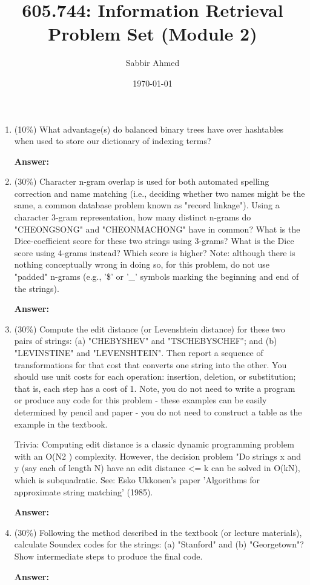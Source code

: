 \documentclass[11pt]{article}
\title{605.744: Information Retrieval \\ Problem Set (Module 2)}
\author{Sabbir Ahmed}
\date{\today}
\begin{document}
\maketitle	

    \begin{enumerate}

        \item (10\%) What advantage(s) do balanced binary trees have over hashtables when used to store our dictionary of indexing terms?

        \textbf{Answer:}

        \item (30\%) Character n-gram overlap is used for both automated spelling correction and name matching (i.e., deciding whether two names might be the same, a common database problem known as "record linkage"). Using a character 3-gram representation, how many distinct n-grams do "CHEONGSONG" and "CHEONMACHONG" have in common? What is the Dice-coefficient score for these two strings using 3-grams? What is the Dice score using 4-grams instead? Which score is higher? Note: although there is nothing conceptually wrong in doing so, for this problem, do not use "padded" n-grams (e.g., '\$' or '\_' symbols marking the beginning and end of the strings).

        \textbf{Answer:}

        \item (30\%) Compute the edit distance (or Levenshtein distance) for these two pairs of strings: (a) "CHEBYSHEV" and "TSCHEBYSCHEF"; and (b) "LEVINSTINE" and "LEVENSHTEIN". Then report a sequence of transformations for that cost that converts one string into the other. You should use unit costs for each operation: insertion, deletion, or substitution; that is, each step has a cost of 1. Note, you do not need to write a program or produce any code for this problem - these examples can be easily determined by pencil and paper - you do not need to construct a table as the example in the textbook.

        Trivia: Computing edit distance is a classic dynamic programming problem with an O(N2 ) complexity. However, the decision problem "Do strings x and y (say each of length N) have an edit distance <= k can be solved in O(kN), which is subquadratic. See: Esko Ukkonen's paper 'Algorithms for approximate string matching' (1985).

        \textbf{Answer:}

        \item (30\%) Following the method described in the textbook (or lecture materials), calculate Soundex codes for the strings: (a) "Stanford" and (b) "Georgetown"? Show intermediate steps to produce the final code.

        \textbf{Answer:}

    \end{enumerate}
\end{document}
